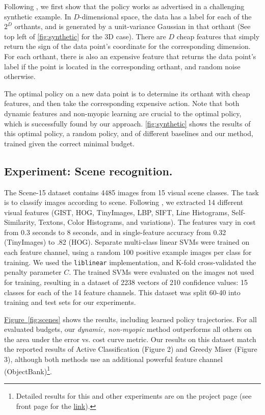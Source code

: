 Following \parencite{Xu-ICML-2013}, we first show that the policy works as advertised in a challenging synthetic example.
In $D$-dimensional space, the data has a label for each of the $2^D$ orthants, and is generated by a unit-variance Gaussian in that orthant (See top left of \autoref{fig:synthetic} for the 3D case).
There are $D$ cheap features that simply return the sign of the data point's coordinate for the corresponding dimension.
For each orthant, there is also an expensive feature that returns the data point's label if the point is located in the corresponding orthant, and random noise otherwise.

The optimal policy on a new data point is to determine its orthant with cheap features, and then take the corresponding expensive action.
Note that both dynamic features and non-myopic learning are crucial to the optimal policy, which is successfully found by our approach.
\autoref{fig:synthetic} shows the results of this optimal policy, a random policy, and of different baselines and our method, trained given the correct minimal budget.

\subsection{Experiment: Scene recognition.}



The Scene-15 dataset \parencite{Lazebnik-CVPR-2006} contains 4485 images from 15 visual scene classes.
The task is to classify images according to scene.
Following \parencite{Xiao-CVPR-2010}, we extracted 14 different visual features (GIST, HOG, TinyImages, LBP, SIFT, Line Histograms, Self-Similarity, Textons, Color Histograms, and variations).
The features vary in cost from 0.3 seconds to 8 seconds, and in single-feature accuracy from 0.32 (TinyImages) to .82 (HOG).
Separate multi-class linear SVMs were trained on each feature channel, using a random 100 positive example images per class for training.
We used the \texttt{liblinear} implementation, and K-fold cross-validated the penalty parameter $C$.
The trained SVMs were evaluated on the images not used for training, resulting in a dataset of 2238 vectors of 210 confidence values: 15 classes for each of the 14 feature channels.
This dataset was split 60-40 into training and test sets for our experiments.

\hyperref[fig:scenes]{Figure~\ref*{fig:scenes}} shows the results, including learned policy trajectories.
For all evaluated budgets, our \emph{dynamic, non-myopic} method outperforms all others on the area under the error vs. cost curve metric.
Our results on this dataset match the reported results of Active Classification \parencite{Gao-NIPS-2011} (Figure 2) and Greedy Miser \parencite{Xu-ICML-2012} (Figure 3), although both methods use an additional powerful feature channel (ObjectBank)\footnote{Detailed results for this and other experiments are on the project page (see front page for the \href{http://sergeykarayev.com/recognition-on-a-budget/}{link}).}.

